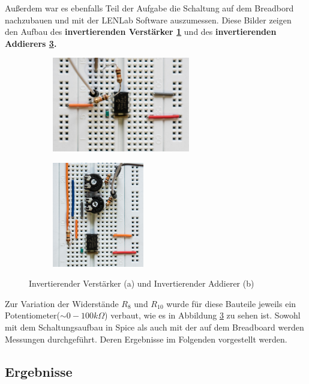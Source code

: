 \newpage
Außerdem war es ebenfalls Teil der Aufgabe die Schaltung auf dem Breadbord nachzubauen und mit der LENLab Software auszumessen. Diese Bilder zeigen den Aufbau des \textbf{invertierenden Verstärker \ref{invV}} und des \textbf{invertierenden Addierers \ref{invA}.}

\begin{figure}[h]
\centering
\begin{subfigure}{.5\textwidth}
  \centering
  \includegraphics[width=6cm]{pics/Invertierer_aufgebaut.jpg}
  \label{invV}
\end{subfigure}%
\begin{subfigure}{.5\textwidth}
  \centering
  \includegraphics[width=4cm]{pics/Addierer_aufgebaut.jpg}
  \label{invA}
\end{subfigure}
\caption{Invertierender Verstärker (a) und Invertierender Addierer (b)}
\end{figure}

Zur Variation der Widerstände $R_{8}$ und $R_{10}$ wurde für diese Bauteile jeweils ein \newline Potentiometer($\sim 0-100k\Omega$) verbaut, wie es in Abbildung \ref{invA} zu sehen ist.
\newline Sowohl mit dem Schaltungsaufbau in Spice als auch mit der auf dem Breadboard werden Messungen durchgeführt. Deren Ergebnisse im Folgenden vorgestellt werden.

\subsection{Ergebnisse}

